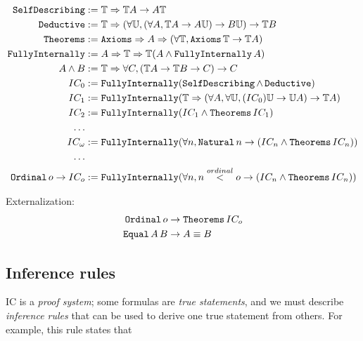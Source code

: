 \documentclass{article}
\begin{document}
  \begin{align*}
    \operatorname{\texttt{SelfDescribing}} &:= \mathbb{T} \Rightarrow \mathbb{T}A \to A\mathbb{T}\\
    \operatorname{\texttt{Deductive}} &:= \mathbb{T} \Rightarrow (\forall \mathbb{U}, (\forall A, \mathbb{T}A \to A\mathbb{U}) \to B\mathbb{U}) \to \mathbb{T}B\\
    \operatorname{\texttt{Theorems}} &:= \operatorname{\texttt{Axioms}} \Rightarrow A \Rightarrow (\forall \mathbb{T}, \operatorname{\texttt{Axioms}} \mathbb{T} \to \mathbb{T}A) \\ 
    \operatorname{\texttt{FullyInternally}} &:= A \Rightarrow \mathbb{T} \Rightarrow \mathbb{T} (A \wedge \operatorname{\texttt{FullyInternally}} A)\\
    A \wedge B &:= \mathbb{T} \Rightarrow \forall C, (\mathbb{T}A \to \mathbb{T}B \to C) \to C\\
    IC_0 &:= \operatorname{\texttt{FullyInternally}}(\operatorname{\texttt{SelfDescribing}} \wedge \operatorname{\texttt{Deductive}})\\
    IC_1 &:= \operatorname{\texttt{FullyInternally}}(\mathbb{T} \Rightarrow (\forall A, \forall \mathbb{U}, (IC_0)\mathbb{U} \to \mathbb{U}{A}) \to \mathbb{T}A)\\
    IC_2 &:= \operatorname{\texttt{FullyInternally}}(IC_1 \wedge \operatorname{\texttt{Theorems}} IC_1)\\
    \dots \\
    IC_\omega &:= \operatorname{\texttt{FullyInternally}}(\forall n, \operatorname{\texttt{Natural}} n \to (IC_n \wedge \operatorname{\texttt{Theorems}} IC_n))\\
    \dots \\
    \operatorname{\texttt{Ordinal}} o \to IC_o &:= \operatorname{\texttt{FullyInternally}}(\forall n, n \stackrel{ordinal}{<} o \to (IC_n \wedge \operatorname{\texttt{Theorems}} IC_n))\\
  \end{align*}
  
  Externalization:
  \begin{align*}
    \operatorname{\texttt{Ordinal}} o &\to \operatorname{\texttt{Theorems}} IC_o\\
    \operatorname{\texttt{Equal}} A\,B &\to A \equiv B\\
  \end{align*}
  
  
  \subsection{Inference rules}
  
  IC is a \emph{proof system}; some formulas are \emph{true statements}, and we must describe \emph{inference rules} that can be used to derive one true statement from others. For example, this rule states that
  
\end{document}

